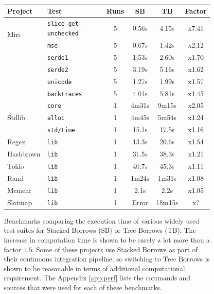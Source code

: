 \documentclass[a4paper,11pt]{article}
\theoremstyle{plain}
\theoremstyle{definition}
\theoremstyle{remark}
\begin{document}
\begin{figure}
    \centering
    \begin{tabular}{|l|l|c|c|c|c|}
        \hline
        Project & Test & Runs & SB & TB & Factor \\
        \hline
        \multirow{2}{9em}{Miri}
            & \texttt{slice-get-unchecked} & 5 & 0.56s & 4.15s & {\color{Red}x7.41} \\
            & \texttt{mse} & 5 & 0.67s & 1.42s & {\color{Red}x2.12} \\
            & \texttt{serde1} & 5 & 1.53s & 2.60s & {\color{YellowOrange}x1.70} \\
            & \texttt{serde2} & 5 & 3.19s & 5.16s & {\color{YellowOrange}x1.62} \\
            & \texttt{unicode} & 5 & 1.27s & 1.99s & {\color{YellowOrange}x1.57} \\
            & \texttt{backtraces} & 5 & 4.01s & 5.81s & {\color{YellowOrange}x1.45} \\
        \hline
        \multirow{3}{9em}{Stdlib}
            & \texttt{core} & 1 & 4m31s & 9m15s & {\color{Red}x2.05} \\
            & \texttt{alloc} & 1 & 4m45s & 5m54s & {\color{LimeGreen}x1.24} \\
            & \texttt{std/time} & 1 & 15.1s & 17.5s & {\color{LimeGreen}x1.16} \\
        \hline
        \multirow{1}{9em}{Regex}
            & \texttt{lib} & 1 & 13.3s & 20.6s & {\color{YellowOrange}x1.54} \\
        \multirow{1}{9em}{Hashbrown}
            & \texttt{lib} & 1 & 31.5s & 38.3s & {\color{LimeGreen}x1.21} \\
        \multirow{1}{9em}{Tokio}
            & \texttt{lib} & 1 & 40.7s & 45.3s & {\color{LimeGreen}x1.11} \\
        \multirow{1}{9em}{Rand}
            & \texttt{lib} & 1 & 1m24s & 1m31s & {\color{LimeGreen}x1.08} \\
        \multirow{1}{9em}{Memchr}
            & \texttt{lib} & 1 & 2.1s & 2.2s & {\color{LimeGreen}x1.05} \\
        \multirow{1}{9em}{Slotmap}
            & \texttt{lib} & 1 & {\color{Red}Error} & 18m15s & {\color{LimeGreen}x?} \\

        \hline
    \end{tabular}
    \caption{
        Benchmarks comparing the execution time of various widely used test suites
        for Stacked Borrows (SB) or Tree Borrows (TB). The increase in computation time
        is shown to be rarely a lot more than a factor \(1.5\).
        Some of these projects use Stacked Borrows as part of their continuous integration
        pipeline, so switching to Tree Borrows is shown to be reasonable in terms of
        additional computational requirement.
        The Appendix \ref{app:perf} lists the commands and sources
        that were used for each of these benchmarks.
    }
    \label{fig:perf}
\end{figure}
\end{document}
